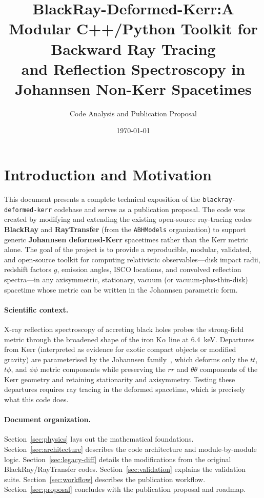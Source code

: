 \documentclass[11pt,twoside]{article}
\title{BlackRay-Deformed-Kerr:\newline A Modular C++/Python Toolkit for Backward Ray Tracing\\ and Reflection Spectroscopy in Johannsen Non-Kerr Spacetimes}
\author{Code Analysis and Publication Proposal}
\date{\today}
\begin{document}
\maketitle

\tableofcontents
\newpage

\section{Introduction and Motivation}

This document presents a complete technical exposition of the \texttt{blackray-deformed-kerr} codebase and serves as a publication proposal. The code was created by modifying and extending the existing
open-source ray-tracing codes \textbf{BlackRay} and \textbf{RayTransfer} (from the
\texttt{ABHModels} organization) to support generic \textbf{Johannsen deformed-Kerr}
spacetimes rather than the Kerr metric alone. The goal of the project is to provide
a reproducible, modular, validated, and open-source toolkit for computing
relativistic observables---disk impact radii, redshift factors $g$, emission
angles, ISCO locations, and convolved reflection spectra---in any
axisymmetric, stationary, vacuum (or vacuum-plus-thin-disk) spacetime whose
metric can be written in the Johannsen parametric form.

\paragraph{Scientific context.}
X-ray reflection spectroscopy of accreting black holes probes the strong-field
metric through the broadened shape of the iron K$\alpha$ line at 6.4~keV.
Departures from Kerr (interpreted as evidence for exotic compact objects or
modified gravity) are parameterised by the Johannsen family~\cite{Johannsen2013},
which deforms only the $tt$, $t\phi$, and $\phi\phi$ metric components while
preserving the $rr$ and $\theta\theta$ components of the Kerr geometry and
retaining stationarity and axisymmetry. Testing these departures requires
ray tracing in the deformed spacetime, which is precisely what this code does.

\paragraph{Document organization.}
Section~\ref{sec:physics} lays out the mathematical foundations. Section~\ref{sec:architecture}
describes the code architecture and module-by-module logic. Section~\ref{sec:legacy-diff}
details the modifications from the original BlackRay/RayTransfer codes. Section~\ref{sec:validation}
explains the validation suite. Section~\ref{sec:workflow} describes the publication workflow.
Section~\ref{sec:proposal} concludes with the publication proposal and roadmap.
\end{document}
